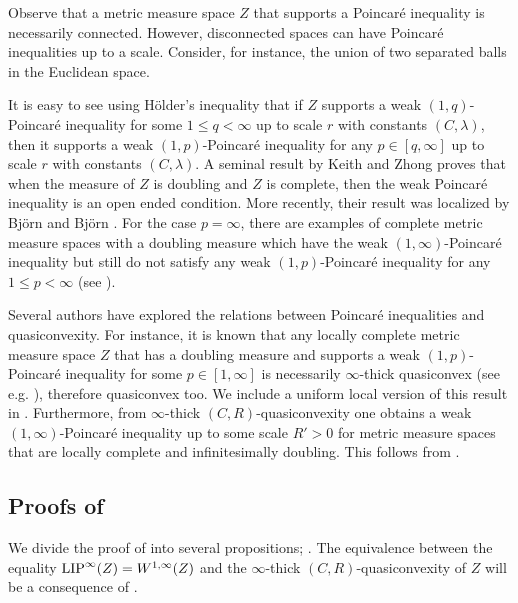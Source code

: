 \documentclass[reqno]{amsart}
\newcommand{\LIP}{{\rm LIP}}
\numberwithin{equation}{section}
\theoremstyle{remark}
\begin{document}
Observe that a metric measure space $Z$ that supports a Poincaré inequality is necessarily connected. However, disconnected spaces can have Poincaré inequalities up to a scale. Consider, for instance, the union of two separated balls in the Euclidean space.




It is easy to see using Hölder's inequality that if $Z$ supports a weak $(1,q)$-Poincaré inequality for some $1\leq q<\infty$ up to scale $r$ with constants $(C,\lambda)$, then it supports a weak $(1,p)$-Poincaré inequality for any $p\in [q,\infty]$ up to scale $r$ with constants $(C,\lambda)$. A seminal result by Keith and Zhong \cite{KZ2008} proves that when the measure of $Z$ is doubling and $Z$ is complete, then the weak Poincaré inequality is an open ended condition. More recently, their result was localized by Björn and Björn \cite{Bj:Bj:18}. For the case $p=\infty$, there are examples of complete metric measure spaces with a doubling measure which have the weak $(1,\infty)$-Poincaré inequality but still do not satisfy any weak $(1,p)$-Poincaré inequality for any $1\leq p<\infty$ (see \cite[Example 2]{DSW}). 



Several authors have explored the relations between Poincaré inequalities and quasiconvexity. For instance, it is known that any locally complete metric measure space $Z$ that has a doubling measure and supports a weak $(1,p)$-Poincaré inequality for some $p\in [1,\infty]$ is necessarily $\infty$-thick quasiconvex (see e.g. \cite[Proposition 4.3]{Durand_2}), therefore quasiconvex too. We include a uniform local version of this result in . Furthermore, from $\infty$-thick $(C,R)$-quasiconvexity one obtains a weak $(1,\infty)$-Poincaré inequality up to some scale $R'>0$ for metric measure spaces that are locally complete and infinitesimally doubling. This follows from .




 \subsection{Proofs of }\label{sec:p=infty}



We divide the proof of  into several propositions; . The equivalence between the equality $\LIP^{\infty}(Z)=W^{1,\infty}(Z)$ and the $\infty$-thick $(C,R)$-quasiconvexity of $Z$ will be a consequence of .
\end{document}
